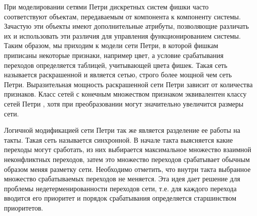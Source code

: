При моделировании сетями Петри дискретных систем фишки часто соответствуют объектам, передаваемым от компонента к компоненту системы. Зачастую эти объекты имеют дополнительные атрибуты, позволяющие различать их и использовать эти различия для управления функционированием системы. Таким образом, мы приходим к модели сети Петри, в которой фишкам приписаны некоторые признаки, например цвет, а условие срабатывания переходов определяется таблицей, учитывающей цвета фишек. Такая сеть называется раскрашенной и является сетью, строго более мощной чем сеть Петри. Выразительная мощность раскрашенной сети Петри зависит от количества признаков. Класс сетей с конечным множеством признаком эквивалентен классу сетей Петри \cite{Kotov} \cite{Jensen}, хотя при преобразовании могут значительно увеличится размеры сети. 

Логичной модификацией сети Петри так же является разделение ее работы на такты. Такая сеть называется синхронной. В начале такта выясняется какие переходы могут сработать, из них выбирается максимальное множество взаимной неконфликтных переходов, затем это множество переходов срабатывает обычным образом меняя разметку сети. Необходимо отметить, что внутри такта выбранное множество срабатываемых переходов не меняется. Эта идея дает решение для проблемы недетерменированности переходов сети, т.е. для каждого перехода вводится его приоритет и порядок срабатывания определяется старшинством приоритетов. 


